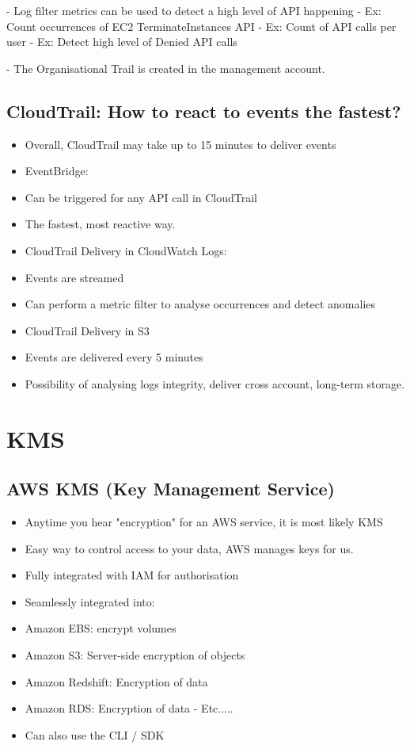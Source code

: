 - Log filter metrics can be used to detect a high level of API happening
- Ex: Count occurrences of EC2 TerminateInstances API
- Ex: Count of API calls per user
- Ex: Detect high level of Denied API calls

- The Organisational Trail is created in the management account.

\subsection{CloudTrail: How to react to events the fastest?}
\begin{itemize}
    \item Overall, CloudTrail may take up to 15 minutes to deliver events
    \item EventBridge:
    \item Can be triggered for any API call in CloudTrail
    \item The fastest, most reactive way.
    \item CloudTrail Delivery in CloudWatch Logs:
    \item Events are streamed
    \item Can perform a metric filter to analyse occurrences and detect anomalies
    \item CloudTrail Delivery in S3
    \item Events are delivered every 5 minutes
    \item Possibility of analysing logs integrity, deliver cross account, long-term storage.
\end{itemize}


\section{KMS}

\subsection{AWS KMS (Key Management Service)}
\begin{itemize}
    \item Anytime you hear "encryption" for an AWS service, it is most likely KMS
    \item Easy way to control access to your data, AWS manages keys for us.
    \item Fully integrated with IAM for authorisation
    \item Seamlessly integrated into:
    \item Amazon EBS: encrypt volumes
    \item Amazon S3: Server-side encryption of objects
    \item Amazon Redshift: Encryption of data
    \item Amazon RDS: Encryption of data
    - Etc.....
    \item Can also use the CLI / SDK
\end{itemize}

